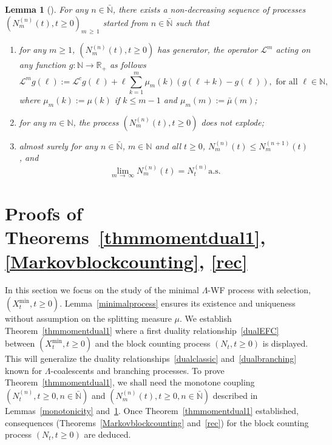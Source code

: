 \documentclass[10pt]{amsart}
\newtheorem{lemm}[theo]{Lemma}\newtheorem{prop}[theo]{Proposition}\newtheorem{coro}[theo]{Corollary}\newtheorem{conj}[theo]{Conjecture}
\theoremstyle{definition}\newtheorem{defi}[theo]{Definition}\newtheorem{rema}[theo]{Remark}\newtheorem{exam}[theo]{Example}\newtheorem{exem}[theo]{Example}\newtheorem{nota}[theo]{Notation}
\newcommand{\bbN}{\mathbb{N}}
\newcommand{\bbR}{\mathbb{R}}
\newcommand{\clL}{\mathcal{L}}
\newcommand*{\romanenumi}{\renewcommand*{\theenumi}{\roman{enumi}}}
\begin{document}
\begin{lemm}[{\cite[Lemma~3.8]{cdiEFC}}] \label{Nnm}
For any $n\in \bar{\bbN}$, there exists a non-decreasing sequence of processes $(N^{(n)}_m(t),t\geq 0)_{m\,\geq\,1}$ started from $n\in \bar{\bbN}$ such that
\begin{enumerate}\romanenumi
\item\label{lemm3.11.i} for any $m\geq 1$, $(N^{(n)}_m(t),t\geq 0)$ has generator, the operator $\clL^{m}$ acting on any function $g: \bbN\rightarrow \bbR_+$ as follows
\begin{equation}\label{genNm}
\clL^{m}g(\ell):=\clL^{c}g(\ell)+\ell\sum_{k=1}^{m}\mu_{m}(k)(g(\ell+k)-g(\ell)), \text{ for all } \ell \in \bbN,
\end{equation}
where $\mu_{m}(k):=\mu(k)$ if $k\leq m-1$ and $\mu_m(m):=\bar{\mu}(m)$;
\item\label{lemm3.11.ii} for any $m\in \bbN$, the process $(N_m^{(n)}(t),t\geq 0)$ does not explode;
\item\label{lemm3.11.iii} almost surely for any $n\in \bar{\bbN}$, $m\in \bbN$ and all $t\geq 0$, $N^{(n)}_{m}(t)\leq N^{(n+1)}_{m}(t)$,
and
\[
\underset{m\,\rightarrow\,\infty}{\lim} N^{(n)}_m(t)=N^{(n)}_t \text{a.s.}
\]
\end{enumerate}
\end{lemm}


\section{Proofs of Theorems~\ref{thmmomentdual1}, \ref{Markovblockcounting}, \ref{rec}}\label{sec1}



In this section we focus on the study of the minimal $\Lambda$-WF process with selection, $(X_t^{\min},t\geq 0)$. Lemma~\ref{minimalprocess} ensures its existence and uniqueness without assumption on the splitting measure $\mu$. We establish Theorem~\ref{thmmomentdual1} where a first duality relationship~\eqref{dualEFC} between $(X_t^{\min},t\geq 0)$ and the block counting process $(N_t,t\geq 0)$ is displayed. This will generalize the duality relationships~\eqref{dualclassic} and~\eqref{dualbranching} known for $\Lambda$-coalescents and branching processes. To prove Theorem~\ref{thmmomentdual1}, we shall need the monotone coupling $(N_t^{(n)},t\geq 0, n\in \bar{\bbN})$ and $(N_m^{(n)}(t),t\geq 0, n\in \bar{\bbN})$ described in Lemmas~\ref{monotonicity} and~\ref{Nnm}. Once Theorem~\ref{thmmomentdual1} established, consequences (Theorems~\ref{Markovblockcounting} and~\ref{rec}) for the block counting process $(N_t,t\geq 0)$ are deduced.
\end{document}
